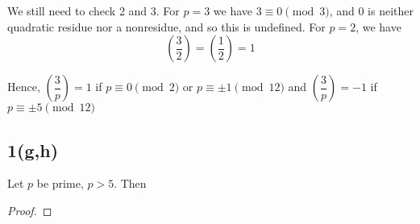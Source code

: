 We still need to check 2 and 3. For $p=3$ we have $3 \equiv 0 \pmod{3}$, and 0
is neither quadratic residue nor a nonresidue, and so this is undefined. For
$p=2$, we have 
\[ \left( \frac{3}{2} \right) = \left( \frac{1}{2} \right) = 1 \]

Hence, $\left( \dfrac{3}{p} \right)  = 1$ if $p \equiv 0 \pmod 2 $ or $p
\equiv \pm 1 \pmod{12}$ and $\left( \dfrac{3}{p} \right)  = -1$ if 
$p \equiv \pm 5 \pmod{12}$


\subsection{1(g,h)}
\begin{lemma}
	Let $p$ be prime, $p > 5$. Then
\end{lemma}
\begin{proof}

\end{proof}
